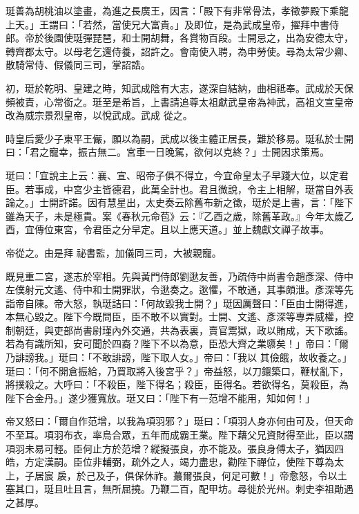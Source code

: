 \begin{pinyinscope}
 珽善為胡桃油以塗畫，為進之長廣王，因言：「殿下有非常骨法，孝徵夢殿下乘龍上天。」王謂曰：「若然，當使兄大富貴。」及即位，是為武成皇帝，擢拜中書侍郎。帝於後園使珽彈琵琶，和士開胡舞，各賞物百段。士開忌之，出為安德太守，轉齊郡太守。以母老乞還侍養，詔許之。會南使入聘，為申勞使。尋為太常少卿、散騎常侍、假儀同三司，掌詔誥。



 初，珽於乾明、皇建之時，知武成陰有大志，遂深自結納，曲相祗奉。武成於天保頻被責，心常銜之。珽至是希旨，上書請追尊太祖獻武皇帝為神武，高祖文宣皇帝改為威宗景烈皇帝，以悅武成。武成
 從之。



 時皇后愛少子東平王儼，願以為嗣，武成以後主體正居長，難於移易。珽私於士開曰：「君之寵幸，振古無二。宮車一日晚駕，欲何以克終？」士開因求策焉。



 珽曰：「宜說主上云：襄、宣、昭帝子俱不得立，今宜命皇太子早踐大位，以定君臣。若事成，中宮少主皆德君，此萬全計也。君且微說，令主上相解，珽當自外表論之。」士開許諾。因有慧星出，太史奏云除舊布新之徵，珽於是上書，言：「陛下雖為天子，未是極貴。案《春秋元命苞》云：『乙酉之歲，除舊革政。』今年太歲乙酉，宜傳位東宮，令君臣之分早定。且以上應天道。」並上魏獻文禪子故事。



 帝從之。由是拜
 祕書監，加儀同三司，大被親寵。



 既見重二宮，遂志於宰相。先與黃門侍郎劉逖友善，乃疏侍中尚書令趙彥深、侍中左僕射元文遙、侍中和士開罪狀，令逖奏之。逖懼，不敢通，其事頗泄。彥深等先詣帝自陳。帝大怒，執珽詰曰：「何故毀我士開？」珽因厲聲曰：「臣由士開得進，本無心毀之。陛下今既問臣，臣不敢不以實對。士開、文遙、彥深等專弄威權，控制朝廷，與吏部尚書尉瑾內外交通，共為表裏，賣官鬻獄，政以賄成，天下歌謠。若為有識所知，安可聞於四裔？陛下不以為意，臣恐大齊之業隳矣！」帝曰：「爾乃誹謗我。」珽曰：「不敢誹謗，陛下取人女。」帝曰：「我以
 其儉餓，故收養之。」珽曰：「何不開倉振給，乃買取將入後宮乎？」帝益怒，以刀鐶築口，鞭杖亂下，將撲殺之。大呼曰：「不殺臣，陛下得名；殺臣，臣得名。若欲得名，莫殺臣，為陛下合金丹。」遂少獲寬放。珽又曰：「陛下有一范增不能用，知如何！」



 帝又怒曰：「爾自作范增，以我為項羽邪？」珽曰：「項羽人身亦何由可及，但天命不至耳。項羽布衣，率烏合眾，五年而成霸王業。陛下藉父兄資財得至此，臣以謂項羽未易可輕。臣何止方於范增？縱擬張良，亦不能及。張良身傅太子，猶因四皓，方定漢嗣。臣位非輔弼，疏外之人，竭力盡忠，勸陛下禪位，使陛下尊為太上，子居宸
 扆，於己及子，俱保休祚。蕞爾張良，何足可數！」帝愈怒，令以土塞其口，珽且吐且言，無所屈撓。乃鞭二百，配甲坊。尋徙於光州。刺史李祖勛遇之甚厚。




\end{pinyinscope}

